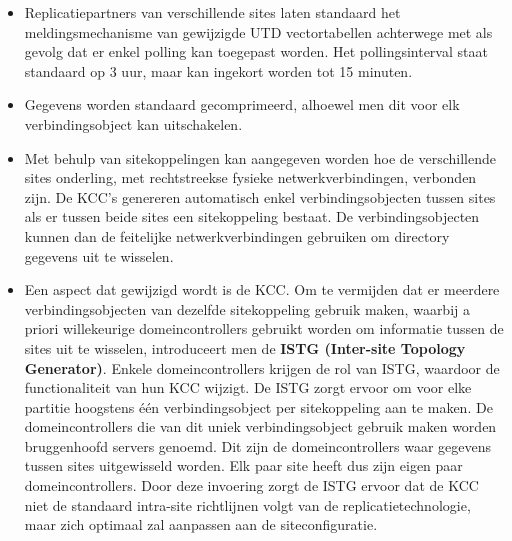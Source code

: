 \begin{enumerate}
		 { 
			\begin{itemize}
				\item Replicatiepartners van verschillende sites laten standaard het meldingsmechanisme van gewijzigde UTD vectortabellen achterwege met als gevolg dat er enkel polling kan toegepast worden. Het pollingsinterval staat standaard op 3 uur, maar kan ingekort worden tot 15 minuten.
				\item Gegevens worden standaard gecomprimeerd, alhoewel men dit voor elk verbindingsobject kan uitschakelen.
				\item Met behulp van sitekoppelingen kan aangegeven worden hoe de verschillende sites onderling, met rechtstreekse fysieke netwerkverbindingen, verbonden zijn. De KCC's genereren automatisch enkel verbindingsobjecten tussen sites als er tussen beide sites een sitekoppeling bestaat. De verbindingsobjecten kunnen dan de feitelijke netwerkverbindingen gebruiken om directory gegevens uit te wisselen. 
				\item Een aspect dat gewijzigd wordt is de KCC. Om te vermijden dat er meerdere verbindingsobjecten van dezelfde sitekoppeling gebruik maken, waarbij a priori willekeurige domeincontrollers gebruikt worden om informatie tussen de sites uit te wisselen, introduceert men de \textbf{ISTG (Inter-site Topology Generator)}. Enkele domeincontrollers krijgen de rol van ISTG, waardoor de functionaliteit van hun KCC wijzigt. De ISTG zorgt ervoor om voor elke partitie hoogstens één verbindingsobject per sitekoppeling aan te maken. De domeincontrollers die van dit uniek verbindingsobject gebruik maken worden bruggenhoofd servers genoemd. Dit zijn de domeincontrollers waar gegevens tussen sites uitgewisseld worden. Elk paar site heeft dus zijn eigen paar domeincontrollers. Door deze invoering zorgt de ISTG ervoor dat de KCC niet de standaard intra-site richtlijnen volgt van de replicatietechnologie, maar zich optimaal zal aanpassen aan de siteconfiguratie.
			\end{itemize}


		}
		

\end{enumerate}
